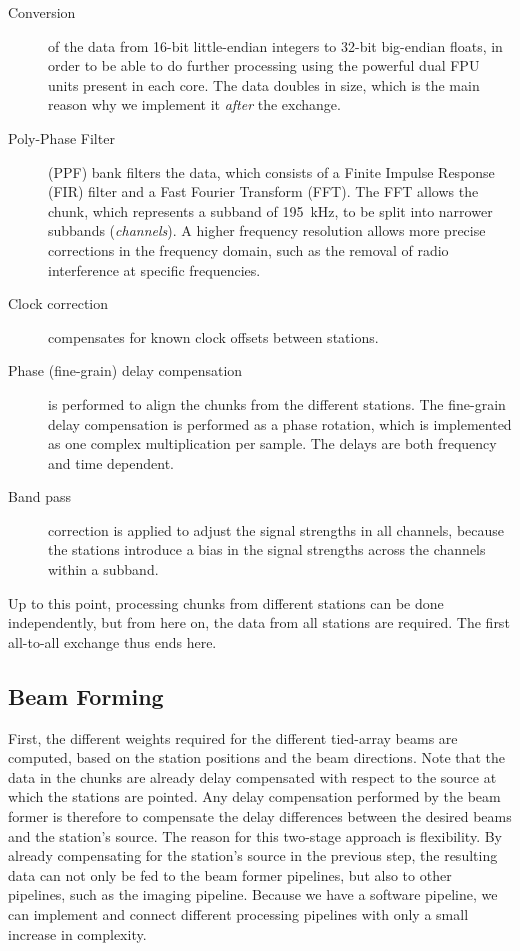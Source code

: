 \documentclass{llncs}
\begin{document}
\begin{description}
\item[Conversion] of the data from 16-bit little-endian integers to 32-bit big-endian floats, in order to be able to do further processing using the powerful dual FPU units present in each core. The data doubles in size, which is the main reason why we implement it \emph{after} the exchange.
\item[Poly-Phase Filter] (PPF) bank filters the data, which consists of a Finite Impulse Response (FIR) filter and a Fast Fourier Transform (FFT). The FFT allows the chunk, which represents a subband of 195~kHz, to be split into narrower subbands (\emph{channels}). A higher frequency resolution allows more precise corrections in the frequency domain, such as the removal of radio interference at specific frequencies.
\item[Clock correction] compensates for known clock offsets between stations.
\item[Phase (fine-grain) delay compensation] is performed to align the chunks from the different stations. The fine-grain delay compensation is performed as a phase rotation, which is implemented as one complex multiplication per sample. The delays are both frequency and time dependent.
\item[Band pass] correction is applied to adjust the signal strengths in all channels, because the stations introduce a bias in the signal strengths across the channels within a subband.
\end{description}

Up to this point, processing chunks from different stations can be done independently, but from here on, the data from all stations are required. The first all-to-all exchange thus ends here.

\subsection{Beam Forming}

First, the different weights required for the different tied-array beams are computed, based on the station positions and the beam directions. Note that the data in the chunks are already delay compensated with respect to the source at which the stations are pointed. Any delay compensation performed by the beam former is therefore to compensate the delay differences between the desired beams and the station's source. The reason for this two-stage approach is flexibility. By already compensating for the station's source in the previous step, the resulting data can not only be fed to the beam former pipelines, but also to other pipelines, such as the imaging pipeline. Because we have a software pipeline, we can implement and connect different processing pipelines with only a small increase in complexity.
\end{document}
